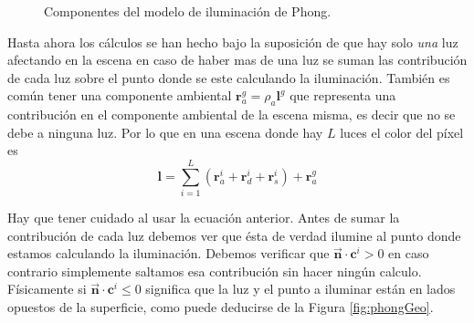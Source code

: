 \begin{figure}[htp]
\begin{center}
  \end{center}
  \caption[Componentes del modelo de iluminación de Phong]{Componentes del modelo de iluminación de Phong.}
  \label{fig:ejemPhongComp}
\end{figure}

Hasta ahora los cálculos se han hecho bajo la suposición de que hay solo \emph{una} luz afectando en la escena en caso de haber mas de una luz se suman las contribución de cada luz sobre el punto donde se este calculando la iluminación. También es común tener una componente ambiental $\textbf{r}_{a}^{g} = \rho_a \textbf{l}^{g}$ que representa una contribución en el componente ambiental de la escena misma, es decir que no se debe a ninguna luz. Por lo que en una escena donde hay $L$ luces el color del píxel es
\begin{equation}
\textbf{l} = \sum_{i = 1}^{L} \left( \textbf{r}_{a}^{i} + \textbf{r}_{d}^{i} + \textbf{r}_{s}^{i} \right) + \textbf{r}_{a}^{g}
\label{ec:phongModelo}
\end{equation}

Hay que tener cuidado al usar la ecuación anterior. Antes de sumar la contribución de cada luz debemos ver que ésta de verdad ilumine al punto donde estamos calculando la iluminación. Debemos verificar que $\vec{\textbf{n}} \cdot \textbf{c}^{i} > 0$ en caso contrario simplemente saltamos esa contribución sin hacer ningún calculo. Físicamente si $\vec{\textbf{n}} \cdot \textbf{c}^{i} \leq 0$ significa que la luz y el punto a iluminar están en lados opuestos de la superficie, como puede deducirse de la Figura \ref{fig:phongGeo}.

